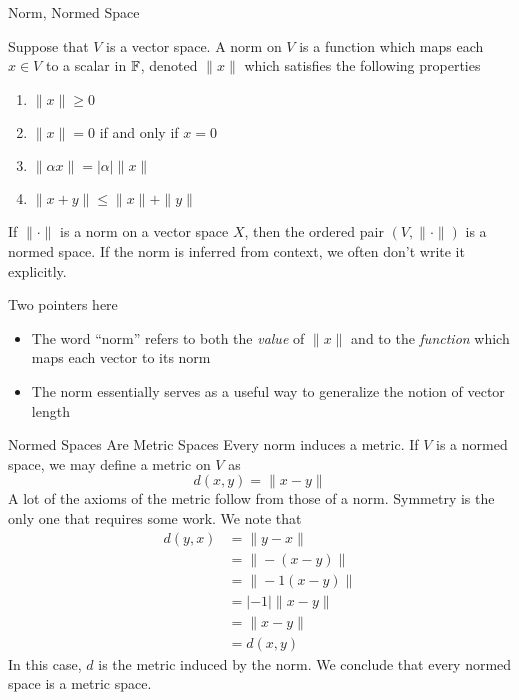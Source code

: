 \documentclass[10pt]{beamer}
\begin{document}
		\begin{frame}{Norm, Normed Space}
				\begin{definition}
						Suppose that $V$ is a vector space. A \alert{norm} on $V$ is a function which maps each $x\in V$ to a scalar in $\mathbb{F}$, denoted $\|x\|$ which satisfies the following properties
						\begin{enumerate}
								\item $\|x\| \geq 0$ 
								\item $\|x\| = 0$ if and only if $x = 0$ 
								\item $\|\alpha x\| = |\alpha| \|x\|$
								\item $\|x + y\| \leq \|x\| + \|y\|$
						\end{enumerate}
						If $\| \cdot \|$ is a norm on a vector space $X$, then the ordered pair $(V, \|\cdot\|)$ is a \alert{normed space}. If the norm is inferred from context, we often don't write it explicitly. 
				\end{definition}
				Two pointers here 
				\begin{itemize}
						\item<2-> The word ``norm'' refers to both the \emph{value} of $\|x\|$ and to the \emph{function} which maps each vector to its norm 
								\item<3-> The norm essentially serves as a useful way to generalize the notion of vector length
				\end{itemize}
		\end{frame}

		\begin{frame}{Normed Spaces Are Metric Spaces}
				Every norm induces a metric. If $V$ is a normed space, we may define a metric on $V$ as 
				\begin{equation*}
						d(x, y) = \|x - y\|
				\end{equation*}
				A lot of the axioms of the metric follow from those of a norm. Symmetry is the only one that requires some work. We note that 
				\begin{align*}
						d(y, x) &= \|y - x\| \\ 
										&= \|-(x - y)\| \\ 
										&= \|-1(x - y)\| \\ 
										&= |-1| \|x-y\| \\ 
										&= \|x - y\| \\ 
										&= d(x, y)
				\end{align*}
				In this case, $d$ is the \alert{metric induced by the norm}. We conclude that every normed space is a metric space. 
		\end{frame}
\end{document}
